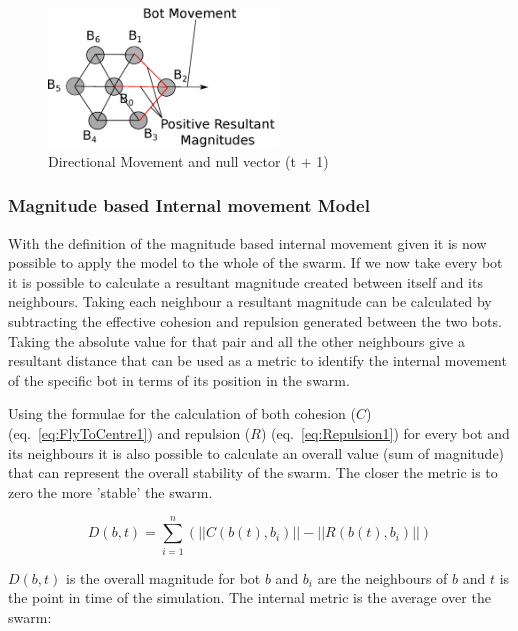 \documentclass[10pt,journal,letterpaper,twoside]{IEEEtran}
\newcommand{\stability}{internal movement}
\newcommand{\Stability}{Internal movement}
\newcommand{\Eq}{eq.}
\begin{document}
\begin{figure}[H]
\begin{center}
\includegraphics[width=6cm]{figures/StabilityNullVector2}
\end{center}
\caption{Directional Movement and null vector (t + 1)} \label{methods:StabilityNullVector2}
\end{figure}

\subsubsection{Magnitude based \Stability{} Model}\label{Section:StabilityModel}

With the definition of the magnitude based \stability{} given it is now possible to apply the model to the whole of the swarm. If we now take every bot it is possible to calculate a resultant magnitude created between itself and its neighbours. Taking each neighbour a resultant magnitude can be calculated by subtracting the effective cohesion and repulsion generated between the two bots. Taking the absolute value for that pair and all the other neighbours give a resultant distance that can be used as a metric to identify the \stability{} of the specific bot in terms of its position in the swarm.

Using the formulae for the calculation of both cohesion ($C$) (\Eq{}~\ref{eq:FlyToCentre1}) and repulsion ($R$) (\Eq{}~\ref{eq:Repulsion1}) for every bot and its neighbours it is also possible to calculate an overall value (sum of magnitude) that can represent the overall stability of the swarm. The closer the metric is to zero the more 'stable' the swarm.


\begin{equation}
\label{eq:BotStabilityT}
D(b,t) = \sum_{i=1}^{n}(||C(b(t),b_{i})|| - ||R(b(t),b_{i})||)
\end{equation}

$D(b,t)$ is the overall magnitude for bot $b$ and $b_i$ are the neighbours of $b$ and $t$ is the point in time of the simulation. The internal metric is the average over the swarm:

\end{document}
